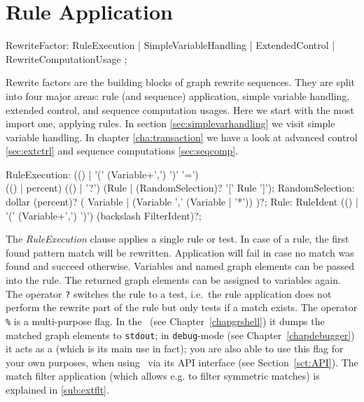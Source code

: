 \section{Rule Application} \label{sec:ruleapplication}

\begin{rail} 
  RewriteFactor: RuleExecution
     | SimpleVariableHandling
     | ExtendedControl
     | RewriteComputationUsage
	; 
\end{rail}

Rewrite factors are the building blocks of graph rewrite sequences.
They are split into four major areas: rule (and sequence) application, simple variable handling, extended control, and sequence computation usages.
Here we start with the most import one, applying rules.
In section \ref{sec:simplevarhandling} we visit simple variable handling.
In chapter \ref{cha:transaction} we have a look at advanced control \ref{sec:extctrl} and sequence computations \ref{sec:seqcomp}.

\begin{rail}    
  RuleExecution: (() | '(' (Variable+',') ')' '=') \\ (() | percent) (() | '?') (Rule | (RandomSelection)? '[' Rule ']');
  RandomSelection: dollar (percent)? ( Variable | (Variable ',' (Variable | '*')) )?;
  Rule: RuleIdent (() | '(' (Variable+',') ')') (backslash FilterIdent)?;
\end{rail}

The \emph{RuleExecution} clause applies a single rule or test.
In case of a rule, the first found pattern match will be rewritten.
Application will fail in case no match was found and succeed otherwise. 
Variables and named graph elements can be passed into the rule.
The returned graph elements can be assigned to variables again.
The operator \texttt{?} switches the rule to a test, i.e.\ the rule application does not perform the rewrite part of the rule but only tests if a match exists.
The operator \texttt{\%} is a multi-purpose flag. 
In the \GrShell\ (see Chapter~\ref{chapgrshell}) it dumps the matched graph elements to \texttt{stdout};
in \texttt{debug}-mode (see Chapter~\ref{chapdebugger}) it acts as a  (which is its main use in fact);
you are also able to use this flag for your own purposes, when using \GrG\ via its API interface (see Section~\ref{sct:API}).
The match filter application (which allows e.g. to filter symmetric matches) is explained in \ref{sub:extflt}.

